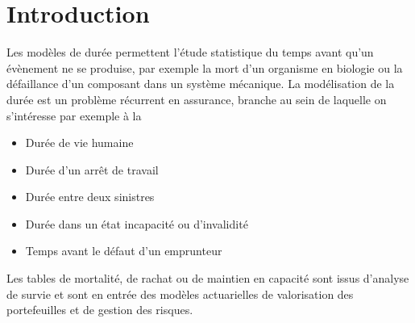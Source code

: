 \chapter{Introduction}\label{sec:introduction}
Les modèles de durée permettent l'étude statistique du temps avant qu'un évènement ne se produise, par exemple la mort d'un organisme en biologie ou la défaillance d'un composant dans un système mécanique. La modélisation de la durée est un problème récurrent en assurance, branche au sein de laquelle on s'intéresse par exemple à la
\begin{itemize}
    \item Durée de vie humaine
    \item Durée d'un arrêt de travail
    \item Durée entre deux sinistres
    \item Durée dans un état incapacité ou d'invalidité 
    \item Temps avant le défaut d'un emprunteur
\end{itemize}
Les tables de mortalité, de rachat ou de maintien en capacité sont issus d'analyse de survie et sont en entrée des modèles actuarielles de valorisation des portefeuilles et de gestion des risques. 
